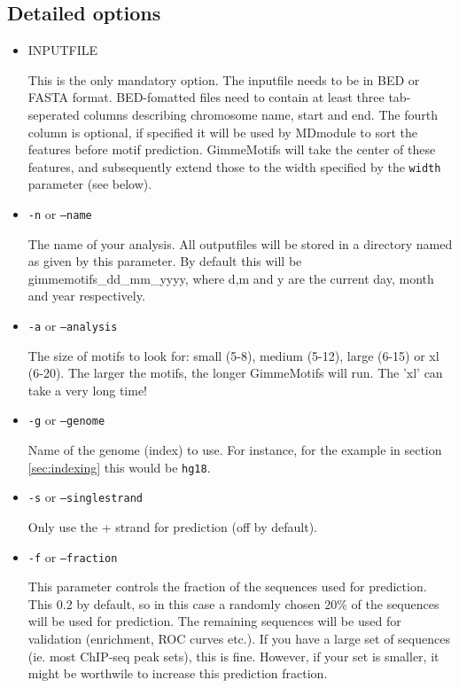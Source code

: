 \documentclass[11pt]{article}
\begin{document}
\subsection{Detailed options}
\begin{itemize}
\item 
INPUTFILE

This is the only mandatory option. The inputfile needs to be in BED or FASTA format. BED-fomatted files need to contain at least three tab-seperated columns describing chromosome name, start and end. The fourth column is optional, if specified it will be used by MDmodule to sort the features before motif prediction. GimmeMotifs will take the center of these features, and subsequently extend those to the width specified by the \texttt{width} parameter (see below).

\item 
\texttt{-n} or \texttt{--name}

The name of your analysis. All outputfiles will be stored in a directory named as given by this parameter. By default this will be gimmemotifs\_dd\_mm\_yyyy, where d,m and y are the current day, month and year respectively.

\item 
\texttt{-a} or \texttt{--analysis}

The size of motifs to look for: small (5-8), medium (5-12), large (6-15) or xl (6-20). The larger the motifs, the longer GimmeMotifs will run. The 'xl' can take a very long time!

\item 
\texttt{-g} or \texttt{--genome}

Name of the genome (index) to use. For instance, for the example in section \ref{sec:indexing} this would be \texttt{hg18}.

\item 
\texttt{-s} or \texttt{--singlestrand}

Only use the + strand for prediction (off by default).

\item 
\texttt{-f} or \texttt{--fraction}

This parameter controls the fraction of the sequences used for prediction. This 0.2 by default, so in this case a randomly chosen 20\% of the sequences will be used for prediction. The remaining sequences will be used for validation (enrichment, ROC curves etc.). If you have a large set of sequences (ie. most ChIP-seq peak sets), this is fine. However, if your set is smaller, it might be worthwile to increase this prediction fraction.


\end{itemize}
\end{document}
